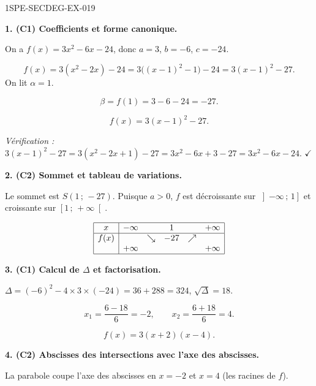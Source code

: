 \begin{corrige}{1SPE-SECDEG-EX-019}


\medskip
\textbf{1. (C1) Coefficients et forme canonique.}


On a $f(x) = 3x^2 - 6x - 24$, donc $a = 3$, $b = -6$, $c = -24$.

\[f(x)=3(x^2-2x)-24=3\bigl((x-1)^2-1\bigr)-24=3(x-1)^2-27.\]
On lit $\alpha=1$.

\[\beta = f(1) = 3 - 6 - 24 = -27.\]

\[\boxed{f(x) = 3(x-1)^2 - 27.}\]

\textit{Vérification :} $3(x-1)^2 - 27 = 3(x^2-2x+1)-27 = 3x^2-6x+3-27 = 3x^2-6x-24$. \hfill $\checkmark$

\medskip
\textbf{2. (C2) Sommet et tableau de variations.}


Le sommet est $S(1\,;\,-27)$. Puisque $a > 0$, $f$ est décroissante sur $\left]-\infty\,;\,1\right]$ et croissante sur $\left[1\,;\,+\infty\right[$.

\[
\begin{array}{|c|ccccc|}
\hline
x & -\infty & & 1 & & +\infty \\
\hline
f(x) & & \searrow & -27 & \nearrow & \\
 & +\infty & & & & +\infty \\
\hline
\end{array}
\]

\medskip
\textbf{3. (C1) Calcul de $\Delta$ et factorisation.}


$\Delta = (-6)^2 - 4 \times 3 \times (-24) = 36 + 288 = 324$, $\sqrt{\Delta} = 18$.

\[x_1 = \frac{6 - 18}{6} = -2, \qquad x_2 = \frac{6 + 18}{6} = 4.\]

\[\boxed{f(x) = 3(x + 2)(x - 4).}\]

\medskip
\textbf{4. (C2) Abscisses des intersections avec l'axe des abscisses.}


La parabole coupe l'axe des abscisses en $x = -2$ et $x = 4$ (les racines de $f$).


\end{corrige}
